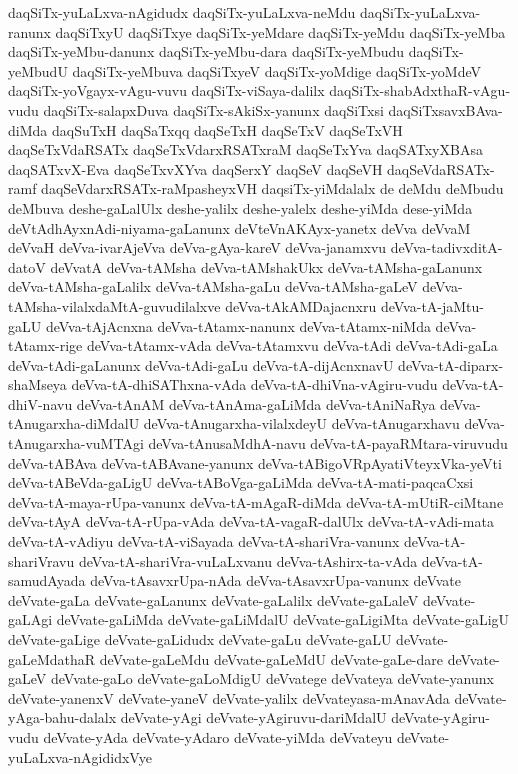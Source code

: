 {daqSiTx-yuLaLxva-nAgidudx
daqSiTx-yuLaLxva-neMdu
daqSiTx-yuLaLxva-ranunx
daqSiTxyU
daqSiTxye
daqSiTx-yeMdare
daqSiTx-yeMdu
daqSiTx-yeMba
daqSiTx-yeMbu-danunx
daqSiTx-yeMbu-dara
daqSiTx-yeMbudu
daqSiTx-yeMbudU
daqSiTx-yeMbuva
daqSiTxyeV
daqSiTx-yoMdige
daqSiTx-yoMdeV
daqSiTx-yoVgayx-vAgu-vuvu
daqSiTx-viSaya-dalilx
daqSiTx-shabAdxthaR-vAgu-vudu
daqSiTx-salapxDuva
daqSiTx-sAkiSx-yanunx
daqSiTxsi
daqSiTxsavxBAva-diMda
daqSuTxH
daqSaTxqq
daqSeTxH
daqSeTxV
daqSeTxVH
daqSeTxVdaRSATx
daqSeTxVdarxRSATxraM
daqSeTxYva
daqSATxyXBAsa
daqSATxvX-Eva
daqSeTxvXYva
daqSerxY
daqSeV
daqSeVH
daqSeVdaRSATx-ramf
daqSeVdarxRSATx-raMpasheyxVH
daqsiTx-yiMdalalx
de
deMdu
deMbudu
deMbuva
deshe-gaLalUlx
deshe-yalilx
deshe-yalelx
deshe-yiMda
dese-yiMda
deVtAdhAyxnAdi-niyama-gaLanunx
deVteVnAKAyx-yanetx
deVva
deVvaM
deVvaH
deVva-ivarAjeVva
deVva-gAya-kareV
deVva-janamxvu
deVva-tadivxditA-datoV
deVvatA
deVva-tAMsha
deVva-tAMshakUkx
deVva-tAMsha-gaLanunx
deVva-tAMsha-gaLalilx
deVva-tAMsha-gaLu
deVva-tAMsha-gaLeV
deVva-tAMsha-vilalxdaMtA-guvudilalxve
deVva-tAkAMDajacnxru
deVva-tA-jaMtu-gaLU
deVva-tAjAcnxna
deVva-tAtamx-nanunx
deVva-tAtamx-niMda
deVva-tAtamx-rige
deVva-tAtamx-vAda
deVva-tAtamxvu
deVva-tAdi
deVva-tAdi-gaLa
deVva-tAdi-gaLanunx
deVva-tAdi-gaLu
deVva-tA-dijAcnxnavU
deVva-tA-diparx-shaMseya
deVva-tA-dhiSAThxna-vAda
deVva-tA-dhiVna-vAgiru-vudu
deVva-tA-dhiV-navu
deVva-tAnAM
deVva-tAnAma-gaLiMda
deVva-tAniNaRya
deVva-tAnugarxha-diMdalU
deVva-tAnugarxha-vilalxdeyU
deVva-tAnugarxhavu
deVva-tAnugarxha-vuMTAgi
deVva-tAnusaMdhA-navu
deVva-tA-payaRMtara-viruvudu
deVva-tABAva
deVva-tABAvane-yanunx
deVva-tABigoVRpAyatiVteyxVka-yeVti
deVva-tABeVda-gaLigU
deVva-tABoVga-gaLiMda
deVva-tA-mati-paqcaCxsi
deVva-tA-maya-rUpa-vanunx
deVva-tA-mAgaR-diMda
deVva-tA-mUtiR-ciMtane
deVva-tAyA
deVva-tA-rUpa-vAda
deVva-tA-vagaR-dalUlx
deVva-tA-vAdi-mata
deVva-tA-vAdiyu
deVva-tA-viSayada
deVva-tA-shariVra-vanunx
deVva-tA-shariVravu
deVva-tA-shariVra-vuLaLxvanu
deVva-tAshirx-ta-vAda
deVva-tA-samudAyada
deVva-tAsavxrUpa-nAda
deVva-tAsavxrUpa-vanunx
deVvate
deVvate-gaLa
deVvate-gaLanunx
deVvate-gaLalilx
deVvate-gaLaleV
deVvate-gaLAgi
deVvate-gaLiMda
deVvate-gaLiMdalU
deVvate-gaLigiMta
deVvate-gaLigU
deVvate-gaLige
deVvate-gaLidudx
deVvate-gaLu
deVvate-gaLU
deVvate-gaLeMdathaR
deVvate-gaLeMdu
deVvate-gaLeMdU
deVvate-gaLe-dare
deVvate-gaLeV
deVvate-gaLo
deVvate-gaLoMdigU
deVvatege
deVvateya
deVvate-yanunx
deVvate-yanenxV
deVvate-yaneV
deVvate-yalilx
deVvateyasa-mAnavAda
deVvate-yAga-bahu-dalalx
deVvate-yAgi
deVvate-yAgiruvu-dariMdalU
deVvate-yAgiru-vudu
deVvate-yAda
deVvate-yAdaro
deVvate-yiMda
deVvateyu
deVvate-yuLaLxva-nAgididxVye
}
